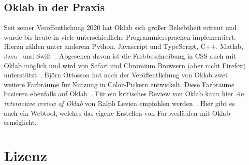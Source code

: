 \documentclass[12pt, a4paper, ngerman]{article}
\begin{document}
\subsection{Oklab in der Praxis}
Seit seiner Veröffentlichung 2020 hat Oklab sich großer Beliebtheit erfreut und 
wurde bis heute in viele unterschiedliche Programmiersprachen implementiert.
Hierzu zählen unter anderem Python, Javascript und TypeScript, C++, Matlab, Java~\cite{Oklab_2020} und Swift~\cite{Ferrell_2021}. 
Abgesehen davon ist die Farbbeschreibung in CSS auch mit Oklab möglich und wird von Safari und Chromium Browsern (aber nicht Firefox) unterstützt~\cite{oklab-CSS_2023}. 
Björn Ottosson hat nach der Veröffentlichung von Oklab zwei weitere Farbräume für Nutzung in Color-Pickern entwickelt. 
Diese Farbräume basieren ebenfalls auf Oklab~\cite{Ottosson_2021}. 
Für ein kritisches Review von Oklab kann hier \emph{An interactive review of Oklab} von Ralph Levien empfohlen werden~\cite{Levien_2021}. 
Hier gibt es auch ein Webtool, welches das eigene Erstellen von Farbverläufen mit Oklab ermöglicht.

\section*{Lizenz}
\doclicenseThis

\newpage
\printbibliography
\end{document}
